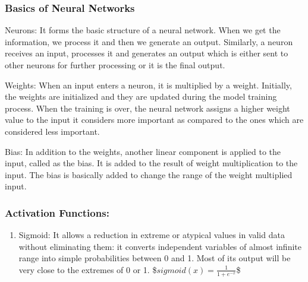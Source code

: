 \documentclass[letterpaper,10pt,english]{jupyterBook}
\begin{document}
\subsubsection{Basics of Neural Networks}
\label{\detokenize{Modelling/Neural_networks:basics-of-neural-networks}}
\sphinxAtStartPar
Neurons: It forms the basic structure of a neural network. When we get
the information, we process it and then we generate an output.
Similarly, a neuron receives an input, processes it and generates an
output which is either sent to other neurons for further processing or
it is the final output.

\sphinxAtStartPar
Weights: When an input enters a neuron, it is multiplied by a weight.
Initially, the weights are initialized and they are updated during the
model training process. When the training is over, the neural network
assigns a higher weight value to the input it considers more important
as compared to the ones which are considered less important.

\sphinxAtStartPar
Bias: In addition to the weights, another linear component is applied to
the input, called as the bias. It is added to the result of weight
multiplication to the input. The bias is basically added to change the
range of the weight multiplied input.


\subsubsection{Activation Functions:}
\label{\detokenize{Modelling/Neural_networks:activation-functions}}\begin{enumerate}
%
\item {} 
\sphinxAtStartPar
Sigmoid: It allows a reduction in extreme or atypical values in
valid data without eliminating them: it converts independent
variables of almost infinite range into simple probabilities between
0 and 1. Most of its output will be very close to the extremes of 0
or 1.
\$\( sigmoid(x) = \frac{1}{1+e^{-x}} \)\$

\end{enumerate}
\end{document}
